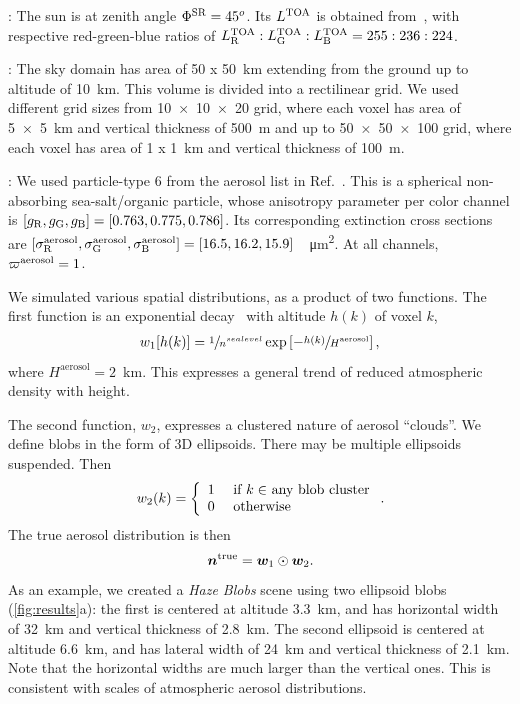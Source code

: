 \documentclass[10pt,letterpaper]{article}
\begin{document}
: The sun is at zenith angle $\Phi^{\rm
  SR}=45^o$. Its $L^{\rm TOA}$ is obtained
from~\cite{BBradiance,sun_composition}, with respective red-green-blue
ratios of $L^{\rm TOA}_{\rm R}:L^{\rm TOA}_{\rm G}:L^{\rm TOA}_{\rm
  B}=255:236:224$.

: The sky domain has area of \SI{50 x
  50}{\km} extending from the ground up to altitude of
\SI{10}{\km}. This volume is divided into a rectilinear grid. We used
different grid sizes from \num{10 x 10 x 20} grid, where each voxel
has area of \SI{5 x 5}{\km} and vertical thickness of \SI{500}{\metre}
and up to \num{50 x 50 x 100} grid, where each voxel has area of \SI{1
  x 1}{\km} and vertical thickness of \SI{100}{\metre}.

: We used particle-type 6 from the aerosol list
in Ref.~\cite{Martonchik2009}. This is a spherical non-absorbing
sea-salt/organic particle, whose anisotropy parameter per color
channel is $[g_{\rm R},g_{\rm G},g_{\rm B}]=[0.763,0.775,0.786]$. Its
corresponding extinction cross sections are $[\sigma^{\rm
  aerosol}_{\rm R}, \sigma^{\rm aerosol}_{\rm G}, \sigma^{\rm
  aerosol}_{\rm
  B}]=[16.5,16.2,15.9]$~\si[sticky-per]{\per\micro\meter\squared}.  At
all channels, $\varpi^{\rm aerosol}=1$.

We simulated various spatial distributions, as a product of two
functions. The first function is an exponential decay~\cite{Levi1980}
with altitude $h(k)$ of voxel $k$,
\begin{align}
  w_1[h(k)] = \sfrac{1} {n^{sea level}}
  \exp\left[-\sfrac{h(k)}{H^\mathrm{aerosol}}\right],
\end{align}
where $H^\mathrm{aerosol}=2$~\si{\km}. This expresses a general trend
of reduced atmospheric density with height.

The second function, $w_2$, expresses a clustered nature of aerosol
``clouds''. We define blobs in the form of 3D ellipsoids. There may be
multiple ellipsoids suspended.  Then
\begin{equation}
  w_2(k) =
  \left\{
    \begin{array}{ll}
      1  & \mbox{ if $k\in$ any blob cluster} \\
      0  & \mbox{ otherwise}
      \label{eq:f2}
    \end{array}
  \right.
  .
  \hspace{-0.05cm}
\end{equation}
The true aerosol distribution is then
\begin{equation}
  \label{eq:ntrue}
  {\bm n}^{\rm true}={\bm w}_1\odot {\bm w}_2  .
  \hspace{-0.05cm}
\end{equation}
As an example, we created a {\em Haze Blobs} scene using two ellipsoid
blobs (\cref{fig:results}a): the first is centered at altitude
\SI{3.3}{\km}, and has horizontal width of \SI{32}{\km} and vertical
thickness of \SI{2.8}{\km}. The second ellipsoid is centered at
altitude \SI{6.6}{\km}, and has lateral width of \SI{24}{\km} and
vertical thickness of \SI{2.1}{\km}. Note that the horizontal widths
are much larger than the vertical ones. This is consistent with scales
of atmospheric aerosol distributions.
\end{document}
